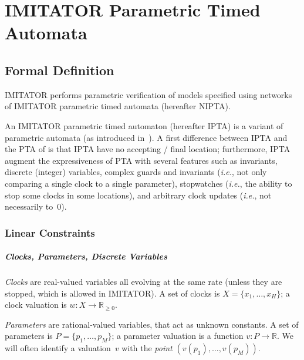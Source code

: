 \documentclass[a4paper,11pt]{report}
\makeatletter
\newcommand{\Clock}{X} %
\newcommand{\ClockCard}{H} %
\newcommand{\clock}{x} %
\newcommand{\clockval}{w} %
\newcommand{\Param}{P} %
\newcommand{\param}{p} %
\newcommand{\ParamCard}{M} %
\newcommand{\pval}{v} %
\newcommand{\grandr}{{\mathbb R}}
\newcommand{\grandrplus}{\grandr_{\geq 0}}
\newcommand{\imitator}{\textsf{IMITATOR}}
\newcommand{\IPTA}{IPTA}
\newcommand{\NIPTA}{NIPTA}
\newcommand{\ie}{\textcolor{colorok}{\textit{i.e.},\@}}
\makeatother
\begin{document}
\chapter{IMITATOR Parametric Timed Automata}\label{section:IPTA}

\section{Formal Definition}\label{section:NIPTA}

\imitator{} performs parametric verification of models specified using networks of \imitator{} parametric timed automata (hereafter \NIPTA{}).

An \imitator{} parametric timed automaton (hereafter \IPTA{}) is a variant of parametric automata (as introduced in~\cite{AHV93}).
A first difference between \IPTA{} and the PTA of \cite{AHV93} is that \IPTA{} have no accepting / final location;
furthermore, \IPTA{} augment the expressiveness of PTA with several features such as invariants, discrete (integer) variables, complex guards and invariants (\ie{} not only comparing a single clock to a single parameter), stopwatches (\ie{} the ability to stop some clocks in some locations), and arbitrary clock updates (\ie{} not necessarily to~0).


\subsection{Linear Constraints}


\paragraph{Clocks, Parameters, Discrete Variables}
\emph{Clocks} are real-valued variables all evolving at the same rate (unless they are stopped, which is allowed in \imitator{}).
A set of clocks is $\Clock = \{ \clock_1, \dots, \clock_\ClockCard \}$;
a clock valuation is
$\clockval \colon \Clock \rightarrow \grandrplus$.

\emph{Parameters} are rational-valued variables, that act as unknown constants.
A set of parameters is $\Param = \{ \param_1, \dots, \param_\ParamCard \} $;
a parameter valuation is a function $\pval\colon \Param \rightarrow \grandr$.
We will often identify a valuation~$\pval$ with the \emph{point} $(\pval(\param_1), \dots, \pval(\param_{\ParamCard}))$.
\end{document}
